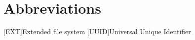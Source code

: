 \documentclass[
11pt,
liststotoc,
bibtotocnumbered,
headheight=34pt     %
]{scrartcl}             %
\newcommand{\centeredpart}[1]{
	\newpage
	\vspace*{\fill}
	\part{#1}
	\vspace*{\fill}
	\newpage
}
\begin{document}
	
	\newpage
	
	\tableofcontents
	\clearpage
	
	\newpage
	

	

	
	\newpage
	\section{Abbreviations}
	\begin{acronym}[SMTP] %
		[EXT]{Extended file system}
		{Universal Unique Identifier}
		
		
		
	\end{acronym}
	
	
	\newpage
	
	\printbibliography
	
	\appendix
	
		
		
		
	
\end{document}
